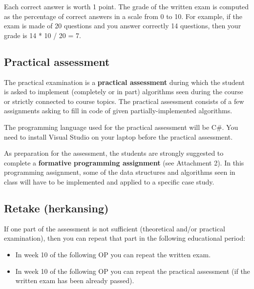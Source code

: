 	\noindent
	Each correct answer is worth 1 point. The grade of the written exam is computed as the percentage of correct answers in a scale from 0 to 10. For example, if the exam is made of 20 questions and you answer correctly 14 questions, then your grade is 14 * 10 / 20 = 7.

	\subsection{Practical assessment}
	The practical examination is a \textbf{practical assessment} during which the student is asked to implement (completely or in part) algorithms seen during the course or strictly connected to course topics. The practical assessment consists of a few assignments asking to fill in code of given partially-implemented algorithms.
	
	The programming language used for the practical assessment will be C\#. You need to install Visual Studio on your laptop before the practical assessment.
	
	As preparation for the assessment, the students are strongly suggested to complete a \textbf{formative programming assignment} (see Attachment 2). In this programming assignment, some of the data structures and algorithms seen in class will have to be implemented and applied to a specific case study.

	
	\subsection{Retake (herkansing)}
	If one part of the assessment is not sufficient (theoretical and/or practical examination), then you can repeat that part in the following educational period:
	\begin{itemize}
	\item In week 10 of the following OP you can repeat the written exam.
	\item In week 10 of the following OP you can repeat the practical assessment (if the written exam has been already passed).
	\end{itemize}
	
